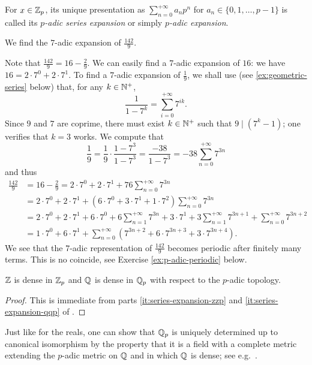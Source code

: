 \documentclass[12pt, leqno, british]{amsart}
\begin{document}
For $x \in \mathbb Z_p$, its unique presentation as $\sum_{n=0}^{+\infty} a_np^n$ for $a_n \in \lbrace 0, 1, \ldots, p-1 \rbrace$ is called its \emph{$p$-adic series expansion} or simply \emph{$p$-adic expansion}.
\begin{eg}
We find the $7$-adic expansion of $\frac{142}{9}$.

Note that $\frac{142}{9} = 16 - \frac{2}{9}$.
We can easily find a $7$-adic expansion of $16$: we have $16 = 2\cdot 7^0 + 2 \cdot 7^1$.
To find a $7$-adic expansion of $\frac{1}{9}$, we shall use (see \eqref{ex:geometric-series} below) that, for any $k \in \mathbb N^+$,
$$ \frac{1}{1-7^k} = \sum_{i=0}^{+\infty} 7^{ik}.$$
Since $9$ and $7$ are coprime, there must exist $k \in \mathbb N^+$ such that $9 \mid (7^k - 1)$; one verifies that $k = 3$ works.
We compute that
$$\frac{1}{9} = \frac{1}{9} \cdot \frac{1 - 7^3}{1 - 7^3} = \frac{-38}{1 - 7^3} = -38\sum_{n=0}^{+\infty} 7^{3n}$$
and thus
\begin{align*}
\frac{142}{9} &= 16 - \frac{2}{9} = 2 \cdot 7^0 + 2 \cdot 7^1 + 76 \sum_{n=0}^{+\infty} 7^{3n} \\
&= 2\cdot 7^0 + 2 \cdot 7^1 + (6\cdot 7^0 + 3 \cdot 7^1 + 1 \cdot 7^2)\sum_{n=0}^{+\infty} 7^{3n} \\
&= 2 \cdot 7^0 + 2 \cdot 7^1 + 6\cdot 7^0 + 6\sum_{n=1}^{+\infty} 7^{3n} + 3\cdot 7^1 + 3\sum_{n=1}^{+\infty} 7^{3n+1} + \sum_{n=0}^{+\infty}7^{3n+2} \\
&= 1 \cdot 7^0 + 6 \cdot 7^1 + \sum_{n=0}^{+\infty} (7^{3n+2} + 6 \cdot 7^{3n+3} + 3 \cdot 7^{3n+4}).
\end{align*}
We see that the $7$-adic representation of $\frac{142}{9}$ becomes periodic after finitely many terms.
This is no coincide, see Exercise \eqref{ex:p-adic-periodic} below.
\end{eg}
\begin{cor}
$\mathbb Z$ is dense in $\mathbb Z_p$ and $\mathbb Q$ is dense in $\mathbb Q_p$ with respect to the $p$-adic topology.
\end{cor}
\begin{proof}
This is immediate from parts \eqref{it:series-expansion-zzp} and \eqref{it:series-expansion-qqp} of .
\end{proof}
Just like for the reals, one can show that $\mathbb Q_p$ is uniquely determined up to canonical isomorphism by the property that it is a field with a complete metric extending the $p$-adic metric on $\mathbb Q$ and in which $\mathbb Q$ is dense; see e.g.~\cite[Theorem 2.4.3]{Eng05}.
\end{document}
